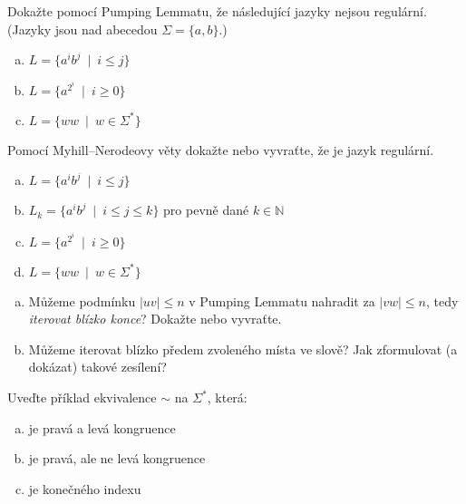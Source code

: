 \documentclass[a4paper,12pt]{amsart}
\begin{document}
\medskip\begin{problem}
    
    Dokažte pomocí Pumping Lemmatu, že následující jazyky nejsou regulární. (Jazyky jsou nad abecedou $\Sigma=\{a,b\}$.)
    
    \medskip
      
    \begin{enumerate}[(a)]\setlength\itemsep{6pt}
        \item $L=\{a^ib^j\ \mid\ i\leq j\}$        
        \item $L=\{a^{2^i}\ \mid\ i\geq 0\}$
        \item $L=\{ww\ \mid \ w\in\Sigma^*\}$
    \end{enumerate}
      
\end{problem}


\medskip\begin{problem}

    Pomocí Myhill--Nerodeovy věty dokažte nebo vyvraťte, že je jazyk regulární.
    \begin{enumerate}[(a)]\setlength\itemsep{6pt}
        \item $L=\{a^ib^j\ \mid\ i\leq j\}$
        \item $L_k=\{a^ib^j\ \mid\ i\leq j\leq k\}$ pro pevně dané $k\in\mathbb N$
        \item $L=\{a^{2^i}\ \mid\ i\geq 0\}$
        \item $L=\{ww\ \mid \ w\in\Sigma^*\}$
    \end{enumerate}

\end{problem}


\medskip\begin{problem}

    \begin{enumerate}[(a)]\setlength\itemsep{6pt}
        \item Můžeme podmínku $|uv|\leq n$ v Pumping Lemmatu nahradit za $|vw|\leq n$, tedy \emph{iterovat blízko konce}? Dokažte nebo vyvraťte.
        \item Můžeme iterovat blízko předem zvoleného místa ve slově? Jak zformulovat (a dokázat) takové zesílení?
    \end{enumerate}

\end{problem}


\medskip\begin{problem}

    Uveďte příklad ekvivalence $\sim$ na $\Sigma^*$, která:

    \begin{enumerate}[(a)]\setlength\itemsep{6pt}
        \item je pravá a levá kongruence
        \item je pravá, ale ne levá kongruence
        \item je konečného indexu
    \end{enumerate}

\end{problem}
\end{document}
